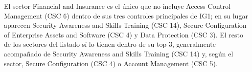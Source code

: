 

\begin{respuesta}
  El sector Financial and Insurance es el único que no incluye Access Control Management (CSC 6) dentro de sus tres controles principales de IG1; en su lugar aparecen Security Awareness and Skills Training (CSC 14), Secure Configuration of Enterprise Assets and Software (CSC 4) y Data Protection (CSC 3). El resto de los sectores del listado sí lo tienen dentro de su top 3, generalmente acompañado de Security Awareness and Skills Training (CSC 14) y, según el sector, Secure Configuration (CSC 4) o Account Management (CSC 5).
\end{respuesta}

